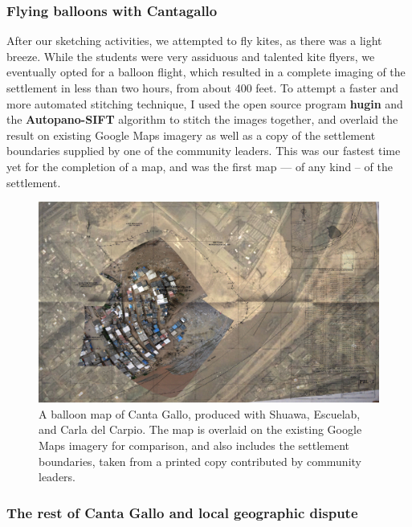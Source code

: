\documentclass[11pt]{report}
\begin{document}
\subsubsection{Flying balloons with Cantagallo}

After our sketching activities, we attempted to fly kites, as there was a light breeze. While the students were very assiduous and talented kite flyers, we eventually opted for a balloon flight, which resulted in a complete imaging of the settlement in less than two hours, from about 400 feet. To attempt a faster and more automated stitching technique, I used the open source program \textbf{hugin} and the \textbf{Autopano-SIFT} algorithm to stitch the images together, and overlaid the result on existing Google Maps imagery as well as a copy of the settlement boundaries supplied by one of the community leaders. This was our fastest time yet for the completion of a map, and was the first map --- of any kind -- of the settlement. 

\begin{figure}[h]
  \begin{center}
	\includegraphics[width=1\textwidth]{images/cantagallo-initial.jpg}
	\caption{A balloon map of Canta Gallo, produced with Shuawa, Escuelab, and Carla del Carpio. The map is overlaid on the existing Google Maps imagery for comparison, and also includes the settlement boundaries, taken from a printed copy contributed by community leaders.}
  \end{center}
\end{figure}

\subsubsection{The rest of Canta Gallo and local geographic dispute}
\end{document}
